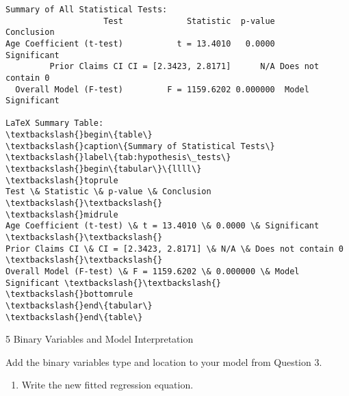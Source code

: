 \documentclass[8pt, twocolumn]{extarticle}
\providecommand{\tightlist}{%
      \setlength{\itemsep}{0pt}\setlength{\parskip}{0pt}}
\begin{document}
    \begin{center}
    \end{center}
    { \hspace*{\fill} \\}
    
    \begin{Verbatim}[commandchars=\\\{\}]


Summary of All Statistical Tests:
                    Test             Statistic  p-value         Conclusion
Age Coefficient (t-test)           t = 13.4010   0.0000        Significant
         Prior Claims CI CI = [2.3423, 2.8171]      N/A Does not contain 0
  Overall Model (F-test)         F = 1159.6202 0.000000  Model Significant

LaTeX Summary Table:
\textbackslash{}begin\{table\}
\textbackslash{}caption\{Summary of Statistical Tests\}
\textbackslash{}label\{tab:hypothesis\_tests\}
\textbackslash{}begin\{tabular\}\{llll\}
\textbackslash{}toprule
Test \& Statistic \& p-value \& Conclusion \textbackslash{}\textbackslash{}
\textbackslash{}midrule
Age Coefficient (t-test) \& t = 13.4010 \& 0.0000 \& Significant \textbackslash{}\textbackslash{}
Prior Claims CI \& CI = [2.3423, 2.8171] \& N/A \& Does not contain 0 \textbackslash{}\textbackslash{}
Overall Model (F-test) \& F = 1159.6202 \& 0.000000 \& Model Significant \textbackslash{}\textbackslash{}
\textbackslash{}bottomrule
\textbackslash{}end\{tabular\}
\textbackslash{}end\{table\}

    \end{Verbatim}

    5 Binary Variables and Model Interpretation

Add the binary variables type and location to your model from Question
3.

    \begin{enumerate}
\def\labelenumi{(\alph{enumi})}
\tightlist
\item
  Write the new fitted regression equation.
\end{enumerate}
\end{document}
